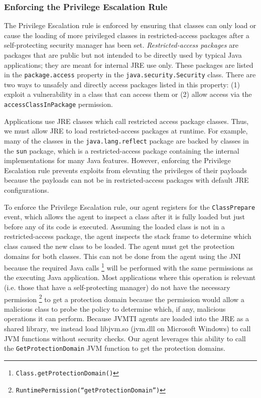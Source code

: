 \documentclass{sig-alternate}
\begin{document}
\subsubsection{Enforcing the Privilege Escalation Rule}\label{sub:Enforcing-the-Privilege}

The Privilege Escalation rule is enforced by ensuring that classes
can only load or cause the loading of more privileged classes in restricted-access
packages after a self-protecting security manager has been set. \textit{Restricted-access
packages} are packages that are public but not intended to be directly
used by typical Java applications; they are meant for internal JRE
use only. These packages are listed in the \texttt{package.access}
property in the \texttt{java.security.Security} class. There are two
ways to unsafely and directly access packages listed in this property:
(1) exploit a vulnerability in a class that can access them or (2)
allow access via the \texttt{accessClassInPackage} permission.

Applications use JRE classes which call restricted access package
classes. Thus, we must allow JRE to load restricted-access packages
at runtime. For example, many of the classes in the \texttt{java.lang.reflect}
package are backed by classes in the \texttt{sun} package, which is
a restricted-access package containing the internal implementations
for many Java features. However, enforcing the Privilege Escalation
rule prevents exploits from elevating the privileges of their payloads
because the payloads can not be in restricted-access packages with
default JRE configurations. 

To enforce the Privilege Escalation rule, our agent registers for
the \texttt{ClassPrepare} event, which allows the agent to inspect
a class after it is fully loaded but just before any of its code is
executed. Assuming the loaded class is not in a restricted-access
package, the agent inspects the stack frame to determine which class
caused the new class to be loaded. The agent must get the protection
domains for both classes. This can not be done from the agent using
the JNI because the required Java calls%
\footnote{\texttt{Class.getProtectionDomain()}%
} will be performed with the same permissions as the executing Java
application. Most applications where this operation is relevant (i.e.
those that have a self-protecting manager) do not have the necessary
permission%
\footnote{\texttt{RuntimePermission(``getProtectionDomain'')}%
} to get a protection domain because the permission would allow a malicious
class to probe the policy to determine which, if any, malicious operations
it can perform. Because JVMTI agents are loaded into the JRE as a
shared library, we instead load libjvm.so (jvm.dll on Microsoft Windows)
to call JVM functions without security checks. Our agent leverages
this ability to call the \texttt{GetProtectionDomain} JVM function
to get the protection domains. 
\end{document}
